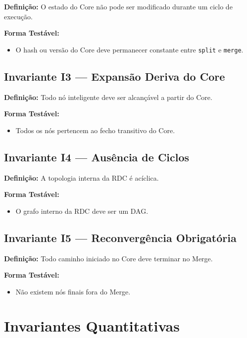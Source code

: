 \documentclass[12pt,a4paper]{article}
\begin{document}
	\textbf{Definição:}  
	O estado do Core não pode ser modificado durante um ciclo de execução.
	
	\textbf{Forma Testável:}
	\begin{itemize}
		\item O hash ou versão do Core deve permanecer constante entre \texttt{split} e \texttt{merge}.
	\end{itemize}
	
	\subsection{Invariante I3 — Expansão Deriva do Core}
	
	\textbf{Definição:}  
	Todo nó inteligente deve ser alcançável a partir do Core.
	
	\textbf{Forma Testável:}
	\begin{itemize}
		\item Todos os nós pertencem ao fecho transitivo do Core.
	\end{itemize}
	
	\subsection{Invariante I4 — Ausência de Ciclos}
	
	\textbf{Definição:}  
	A topologia interna da RDC é acíclica.
	
	\textbf{Forma Testável:}
	\begin{itemize}
		\item O grafo interno da RDC deve ser um DAG.
	\end{itemize}
	
	\subsection{Invariante I5 — Reconvergência Obrigatória}
	
	\textbf{Definição:}  
	Todo caminho iniciado no Core deve terminar no Merge.
	
	\textbf{Forma Testável:}
	\begin{itemize}
		\item Não existem nós finais fora do Merge.
	\end{itemize}
	
	\section{Invariantes Quantitativas}
	
\end{document}

